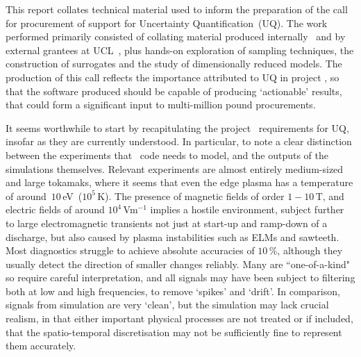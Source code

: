 This report collates technical material used to inform the preparation of the call for 
procurement of support for Uncertainty Quantification~(UQ).
The work performed primarily consisted of collating material produced
internally~\cite{y2re241,y2re242,y2re251,y2re313}
and by external grantees at UCL~\cite{2047352_1-TN-01,2047352_2-TN-01}, plus
hands-on exploration of sampling techniques, the construction of surrogates and the study
of dimensionally reduced models.
The production of this call reflects the importance attributed to UQ in project \nep, so that 
the software produced should be capable of producing `actionable' results, that could form a significant
input to multi-million pound procurements.

It seems worthwhile to start by recapitulating the project
\nep \ requirements for UQ, insofar as they are currently understood. In particular, to
note a clear distinction between the experiments that \nep \ code needs to model, and the
outputs of the simulations themselves.  Relevant experiments are almost entirely medium-sized
and large tokamaks, where it seems that even the edge plasma has a temperature of
around~$10$\,eV~($10^5$\,K). The presence of magnetic fields of order $1-10$\,T, and
electric fields of around $10^4$\,Vm$^{-1}$ implies a hostile environment, subject further
to large electromagnetic transients not just at start-up and ramp-down of a discharge, but also caused by
plasma instabilities such as ELMs and sawteeth.  Most diagnostics struggle to achieve absolute
accuracies of $10$\,\%, although they usually detect the direction of smaller changes reliably.
Many are ``one-of-a-kind" so require careful interpretation, and all signals may have been subject to
filtering both at low and high frequencies, to remove  `spikes' and `drift'.
In comparison, signals from simulation are very `clean', but the simulation may lack
crucial realism, in that either important physical processes are not treated or 
if included, that the spatio-temporal discretisation may not be sufficiently fine to
represent them accurately.


